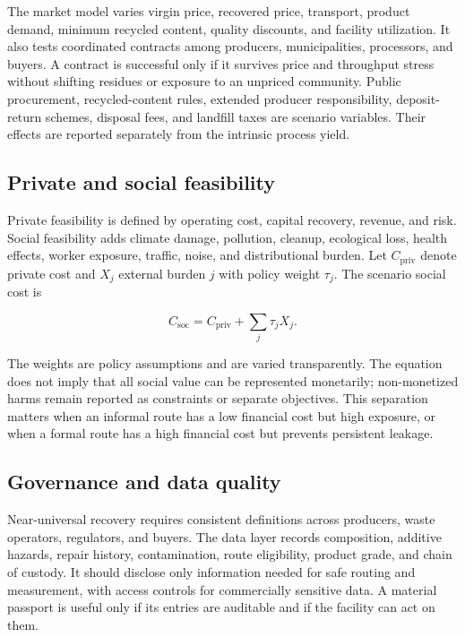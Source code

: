 \documentclass[conference]{IEEEtran}
\begin{document}
The market model varies virgin price, recovered price, transport, product demand, minimum recycled content, quality discounts, and facility utilization. It also tests coordinated contracts among producers, municipalities, processors, and buyers. A contract is successful only if it survives price and throughput stress without shifting residues or exposure to an unpriced community. Public procurement, recycled-content rules, extended producer responsibility, deposit-return schemes, disposal fees, and landfill taxes are scenario variables. Their effects are reported separately from the intrinsic process yield.

\subsection{Private and social feasibility}

Private feasibility is defined by operating cost, capital recovery, revenue, and risk. Social feasibility adds climate damage, pollution, cleanup, ecological loss, health effects, worker exposure, traffic, noise, and distributional burden. Let $C_{\mathrm{priv}}$ denote private cost and $X_j$ external burden $j$ with policy weight $\tau_j$. The scenario social cost is

\begin{equation}
C_{\mathrm{soc}}=C_{\mathrm{priv}}+\sum_j \tau_j X_j.
\label{eq:socialcost}
\end{equation}

The weights are policy assumptions and are varied transparently. The equation does not imply that all social value can be represented monetarily; non-monetized harms remain reported as constraints or separate objectives. This separation matters when an informal route has a low financial cost but high exposure, or when a formal route has a high financial cost but prevents persistent leakage.

\subsection{Governance and data quality}

Near-universal recovery requires consistent definitions across producers, waste operators, regulators, and buyers. The data layer records composition, additive hazards, repair history, contamination, route eligibility, product grade, and chain of custody. It should disclose only information needed for safe routing and measurement, with access controls for commercially sensitive data. A material passport is useful only if its entries are auditable and if the facility can act on them.
\end{document}
